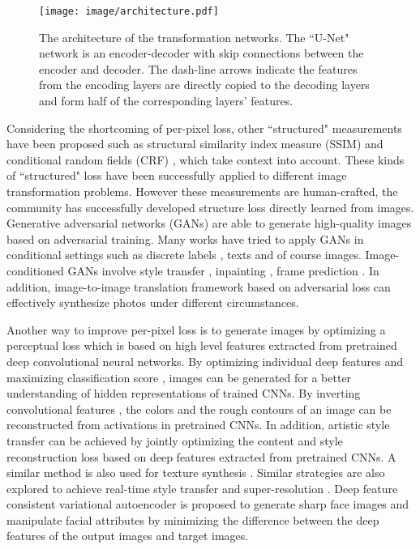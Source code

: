 \documentclass[journal]{IEEEtran}
\begin{document}
\begin{figure*}
\centering
  \texttt{[image: image/architecture.pdf]}
  \caption{The architecture of the transformation networks. The ``U-Net" network is an encoder-decoder with skip connections between the encoder and decoder. The dash-line arrows indicate the features from the encoding layers are directly copied to the decoding layers and form half of the corresponding layers' features.}
  \label{fig:architecture}
\end{figure*}

Considering the shortcoming of per-pixel loss, other ``structured" measurements have been proposed such as structural similarity index measure (SSIM) \cite{wang2004image} and conditional random fields (CRF) \cite{chen2014semantic}, which take context into account. These kinds of ``structured" loss have been successfully applied to different image transformation problems. However these measurements are human-crafted, the community has successfully developed structure loss directly learned from images. Generative adversarial networks (GANs) \cite{goodfellow2014generative} are able to generate high-quality images based on adversarial training. Many works have tried to apply GANs in conditional settings such as discrete labels \cite{mirza2014conditional}, texts \cite{reed2016generative} and of course images. Image-conditioned GANs involve style transfer \cite{li2016precomputed}, inpainting \cite{pathak2016context}, frame prediction \cite{mathieu2015deep}. In addition, image-to-image translation framework \cite{isola2016image} based on adversarial loss can effectively synthesize photos under different circumstances.

Another way to improve per-pixel loss is to generate images by optimizing a perceptual loss which is based on high level features extracted from pretrained deep convolutional neural networks. By optimizing individual deep features \cite{yosinski2015understanding} and maximizing classification score \cite{simonyan2013deep}, images can be generated for a better understanding of hidden representations of trained CNNs. By inverting convolutional features \cite{dosovitskiy2016inverting}, the colors and the rough contours of an image can be reconstructed from activations in pretrained CNNs. In addition, artistic style transfer \cite{gatys2015neural} can be achieved by jointly optimizing the content and style reconstruction loss based on deep features extracted from pretrained CNNs. A similar method is also used for texture synthesis \cite{gatys2015texture}. Similar strategies are also explored to achieve real-time style transfer and super-resolution \cite{johnson2016perceptual}. Deep feature consistent variational autoencoder \cite{hou2017deep} is proposed to generate sharp face images and manipulate facial attributes by minimizing the difference between the deep features of the output images and target images.
\end{document}
